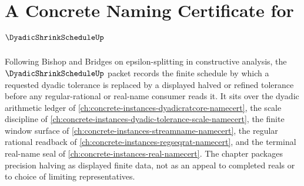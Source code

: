 \chapter{A Concrete Naming Certificate for $\DyadicShrinkScheduleUp$}
\label{ch:concrete-instances-dyadic-shrink-schedule-namecert}

Following Bishop and Bridges on epsilon-splitting in constructive analysis, the $\DyadicShrinkScheduleUp$ packet records the finite schedule by which a requested dyadic tolerance is replaced by a displayed halved or refined tolerance before any regular-rational or real-name consumer reads it. It sits over the dyadic arithmetic ledger of \autoref{ch:concrete-instances-dyadicratcore-namecert}, the scale discipline of \autoref{ch:concrete-instances-dyadic-tolerance-scale-namecert}, the finite window surface of \autoref{ch:concrete-instances-streamname-namecert}, the regular rational readback of \autoref{ch:concrete-instances-regseqrat-namecert}, and the terminal real-name seal of \autoref{ch:concrete-instances-real-namecert}. The chapter packages precision halving as displayed finite data, not as an appeal to completed reals or to choice of limiting representatives.

